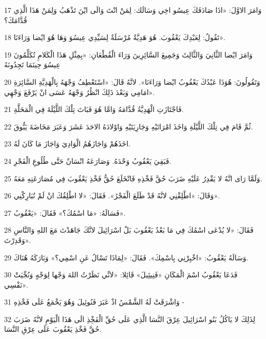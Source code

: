 \par 17 وَامَرَ الاوَّلَ: «اذَا صَادَفَكَ عِيسُو اخِي وَسَالَك: لِمَنْ انْتَ وَالَى ايْنَ تَذْهَبُ وَلِمَنْ هَذَا الَّذِي قُدَّامَكَ؟
\par 18 تَقُولُ: لِعَبْدِكَ يَعْقُوبَ. هُوَ هَدِيَّةٌ مُرْسَلَةٌ لِسَيِّدِي عِيسُوَ وَهَا هُوَ ايْضا وَرَاءَنَا».
\par 19 وَامَرَ ايْضا الثَّانِيَ وَالثَّالِثَ وَجَمِيعَ السَّائِرِينَ وَرَاءَ الْقُطْعَانِ: «بِمِثْلِ هَذَا الْكَلامِ تُكَلِّمُونَ عِيسُوَ حِينَمَا تَجِدُونَهُ
\par 20 وَتَقُولُونَ: هُوَذَا عَبْدُكَ يَعْقُوبُ ايْضا وَرَاءَنَا». لانَّهُ قَالَ: «اسْتَعْطِفُ وَجْهَهُ بِالْهَدِيَّةِ السَّائِرَةِ امَامِي وَبَعْدَ ذَلِكَ انْظُرُ وَجْهَهُ عَسَى انْ يَرْفَعَ وَجْهِي».
\par 21 فَاجْتَازَتِ الْهَدِيَّةُ قُدَّامَهُ وَامَّا هُوَ فَبَاتَ تِلْكَ اللَّيْلَةَ فِي الْمَحَلَّةِ.
\par 22 ثُمَّ قَامَ فِي تِلْكَ اللَّيْلَةِ وَاخَذَ امْرَاتَيْهِ وَجَارِيَتَيْهِ وَاوْلادَهُ الاحَدَ عَشَرَ وَعَبَرَ مَخَاضَةَ يَبُّوقَ.
\par 23 اخَذَهُمْ وَاجَازَهُمُ الْوَادِيَ وَاجَازَ مَا كَانَ لَهُ.
\par 24 فَبَقِيَ يَعْقُوبُ وَحْدَهُ. وَصَارَعَهُ انْسَانٌ حَتَّى طُلُوعِ الْفَجْرِ.
\par 25 وَلَمَّا رَاى انَّهُ لا يَقْدِرُ عَلَيْهِ ضَرَبَ حُقَّ فَخْذِهِ فَانْخَلَعَ حُقُّ فَخْذِ يَعْقُوبَ فِي مُصَارَعَتِهِ مَعَهُ.
\par 26 وَقَالَ: «اطْلِقْنِي لانَّهُ قَدْ طَلَعَ الْفَجْرُ». فَقَالَ: «لا اطْلِقُكَ انْ لَمْ تُبَارِكْنِي».
\par 27 فَسَالَهُ: «مَا اسْمُكَ؟» فَقَالَ: «يَعْقُوبُ».
\par 28 فَقَالَ: «لا يُدْعَى اسْمُكَ فِي مَا بَعْدُ يَعْقُوبَ بَلْ اسْرَائِيلَ لانَّكَ جَاهَدْتَ مَعَ اللهِ وَالنَّاسِ وَقَدِرْتَ».
\par 29 وَسَالَهُ يَعْقُوبُ: «اخْبِرْنِي بِاسْمِكَ». فَقَالَ: «لِمَاذَا تَسْالُ عَنِ اسْمِي؟» وَبَارَكَهُ هُنَاكَ.
\par 30 فَدَعَا يَعْقُوبُ اسْمَ الْمَكَانِ «فَنِيئِيلَ» قَائِلا: «لانِّي نَظَرْتُ اللهَ وَجْها لِوَجْهٍ وَنُجِّيَتْ نَفْسِي».
\par 31 وَاشْرَقَتْ لَهُ الشَّمْسُ اذْ عَبَرَ فَنُوئِيلَ وَهُوَ يَخْمَعُ عَلَى فَخْذِهِ -
\par 32 لِذَلِكَ لا يَاكُلُ بَنُو اسْرَائِيلَ عِرْقَ النَّسَا الَّذِي عَلَى حُقِّ الْفَخِْذِ الَى هَذَا الْيَوْمِ لانَّهُ ضَرَبَ حُقَّ فَخْذِ يَعْقُوبَ عَلَى عِرْقِ النَّسَا.

